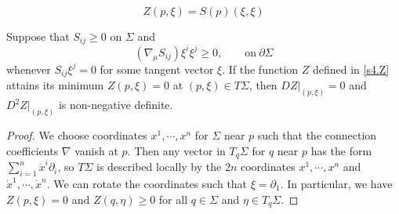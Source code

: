 \documentclass[10pt,a4paper]{amsart}
\begin{document}
\begin{equation}\label{s4.Z}
Z(p,\xi)=S(p)(\xi,\xi)
\end{equation}

\begin{lem}\label{s3:tech-lemma}
Suppose that $S_{ij}\geq 0$ on $\Sigma$ and
\begin{equation}\label{s4.lem1}
  (\nabla_\mu S_{ij})\xi^i\xi^j\geq 0,\qquad\mathrm{ on}~ \partial\Sigma
\end{equation}
whenever $S_{ij}\xi^j=0$ for some tangent vector $\xi$. If the function $Z$ defined in \eqref{s4.Z} attains its minimum $Z(p,\xi)=0$ at $(p,\xi)\in T\Sigma$, then $D Z|_{(p,\xi)}=0$ and $D^2Z|_{(p,\xi)}$ is non-negative definite.
\end{lem}

\begin{proof}
We choose coordinates $x^1,\cdots,x^n$ for $\Sigma$ near $p$ such that the connection coefficients $\nabla$ vanish at $p$. Then any vector in $T_q{\Sigma}$ for $q$ near $p$ has the form $\sum_{i=1}^n{\dot{x}^i \partial_i}$, so $T\Sigma$ is described locally by the $2n$ coordinates $x^1,\cdots,x^n$ and $\dot{x}^1,\cdots,\dot{x}^n$. We can rotate the coordinates such that $\xi=\partial_1$. In particular, we have $Z(p,\xi)=0$ and $Z(q,\eta)\geq 0$ for all $q\in\Sigma$ and $\eta\in T_q\Sigma$.


\end{proof}
\end{document}
